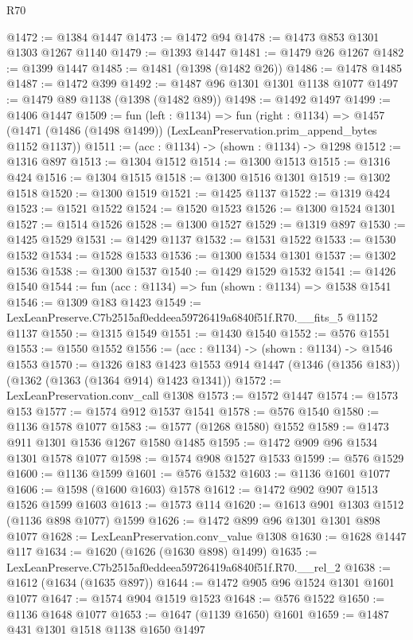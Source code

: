 \begin{lexlean}{R70}
\begin{coremodule}
@1472 := @1384 @1447
@1473 := @1472 @94
@1478 := @1473 @853 @1301 @1303 @1267 @1140
@1479 := @1393 @1447
@1481 := @1479 @26 @1267
@1482 := @1399 @1447
@1485 := @1481 (@1398 (@1482 @26))
@1486 := @1478 @1485
@1487 := @1472 @399
@1492 := @1487 @96 @1301 @1301 @1138 @1077
@1497 := @1479 @89 @1138 (@1398 (@1482 @89))
@1498 := @1492 @1497
@1499 := @1406 @1447
@1509 := fun (left : @1134) =>
  fun (right : @1134) =>
  @1457 (@1471 (@1486 (@1498 @1499)) (LexLeanPreservation.prim_append_bytes @1152 @1137))
@1511 := (acc : @1134) -> (shown : @1134) -> @1298
@1512 := @1316 @897
@1513 := @1304 @1512
@1514 := @1300 @1513
@1515 := @1316 @424
@1516 := @1304 @1515
@1518 := @1300 @1516 @1301
@1519 := @1302 @1518
@1520 := @1300 @1519
@1521 := @1425 @1137
@1522 := @1319 @424
@1523 := @1521 @1522
@1524 := @1520 @1523
@1526 := @1300 @1524 @1301
@1527 := @1514 @1526
@1528 := @1300 @1527
@1529 := @1319 @897
@1530 := @1425 @1529
@1531 := @1429 @1137
@1532 := @1531 @1522
@1533 := @1530 @1532
@1534 := @1528 @1533
@1536 := @1300 @1534 @1301
@1537 := @1302 @1536
@1538 := @1300 @1537
@1540 := @1429 @1529 @1532
@1541 := @1426 @1540
@1544 := fun (acc : @1134) => fun (shown : @1134) => @1538 @1541
@1546 := @1309 @183 @1423
@1549 := LexLeanPreserve.C7b2515af0eddeea59726419a6840f51f.R70.__fits_5 @1152 @1137
@1550 := @1315 @1549
@1551 := @1430 @1540
@1552 := @576 @1551
@1553 := @1550 @1552
@1556 := (acc : @1134) -> (shown : @1134) -> @1546 @1553
@1570 := @1326
    @183
    @1423
    @1553
    @914
    @1447
    (@1346 (@1356 @183))
    (@1362 (@1363 (@1364 @914) @1423 @1341))
@1572 := LexLeanPreservation.conv_call @1308
@1573 := @1572 @1447
@1574 := @1573 @153
@1577 := @1574 @912 @1537 @1541
@1578 := @576 @1540
@1580 := @1136 @1578 @1077
@1583 := @1577 (@1268 @1580) @1552
@1589 := @1473 @911 @1301 @1536 @1267 @1580 @1485
@1595 := @1472 @909 @96 @1534 @1301 @1578 @1077
@1598 := @1574 @908 @1527 @1533
@1599 := @576 @1529
@1600 := @1136 @1599
@1601 := @576 @1532
@1603 := @1136 @1601 @1077
@1606 := @1598 (@1600 @1603) @1578
@1612 := @1472 @902 @907 @1513 @1526 @1599 @1603
@1613 := @1573 @114
@1620 := @1613 @901 @1303 @1512 (@1136 @898 @1077) @1599
@1626 := @1472 @899 @96 @1301 @1301 @898 @1077
@1628 := LexLeanPreservation.conv_value @1308
@1630 := @1628 @1447 @117
@1634 := @1620 (@1626 (@1630 @898) @1499)
@1635 := LexLeanPreserve.C7b2515af0eddeea59726419a6840f51f.R70.__rel_2
@1638 := @1612 (@1634 (@1635 @897))
@1644 := @1472 @905 @96 @1524 @1301 @1601 @1077
@1647 := @1574 @904 @1519 @1523
@1648 := @576 @1522
@1650 := @1136 @1648 @1077
@1653 := @1647 (@1139 @1650) @1601
@1659 := @1487 @431 @1301 @1518 @1138 @1650 @1497

\end{coremodule}
\end{lexlean}
